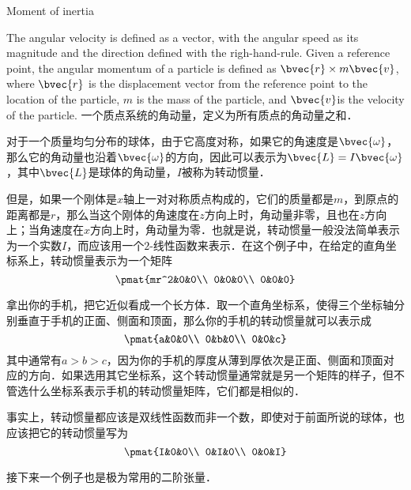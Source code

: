 \begin{example}{Moment of inertia}


The angular velocity is defined as a vector, with the angular speed as its magnitude and the direction defined with the righ-hand-rule. Given a reference point, the angular momentum of a particle is defined as $\bvec{r}\times m\bvec{v}$, where $\bvec{r}$ is the displacement vector from the reference point to the location of the particle, $m$ is the mass of the particle, and $\bvec{v}$is the velocity of the particle. 一个质点系统的角动量，定义为所有质点的角动量之和．

对于一个质量均匀分布的球体，由于它高度对称，如果它的角速度是$\bvec{\omega}$，那么它的角动量也沿着$\bvec{\omega}$的方向，因此可以表示为$\bvec{L}=I\bvec{\omega}$，其中$\bvec{L}$是球体的角动量，$I$被称为转动惯量．

但是，如果一个刚体是$x$轴上一对对称质点构成的，它们的质量都是$m$，到原点的距离都是$r$，那么当这个刚体的角速度在$z$方向上时，角动量非零，且也在$z$方向上；当角速度在$x$方向上时，角动量为零．也就是说，转动惯量一般没法简单表示为一个实数$I$，而应该用一个$2$-线性函数来表示．在这个例子中，在给定的直角坐标系上，转动惯量表示为一个矩阵
\begin{equation}
\pmat{mr^2&0&0\\ 0&0&0\\ 0&0&0}
\end{equation}

拿出你的手机，把它近似看成一个长方体．取一个直角坐标系，使得三个坐标轴分别垂直于手机的正面、侧面和顶面，那么你的手机的转动惯量就可以表示成
\begin{equation}
\pmat{a&0&0\\ 0&b&0\\ 0&0&c}
\end{equation}
其中通常有$a>b>c$，因为你的手机的厚度从薄到厚依次是正面、侧面和顶面对应的方向．如果选用其它坐标系，这个转动惯量通常就是另一个矩阵的样子，但不管选什么坐标系表示手机的转动惯量矩阵，它们都是相似的．

事实上，转动惯量都应该是双线性函数而非一个数，即使对于前面所说的球体，也应该把它的转动惯量写为
\begin{equation}
\pmat{I&0&0\\ 0&I&0\\ 0&0&I}
\end{equation}
\end{example}

接下来一个例子也是极为常用的二阶张量．

